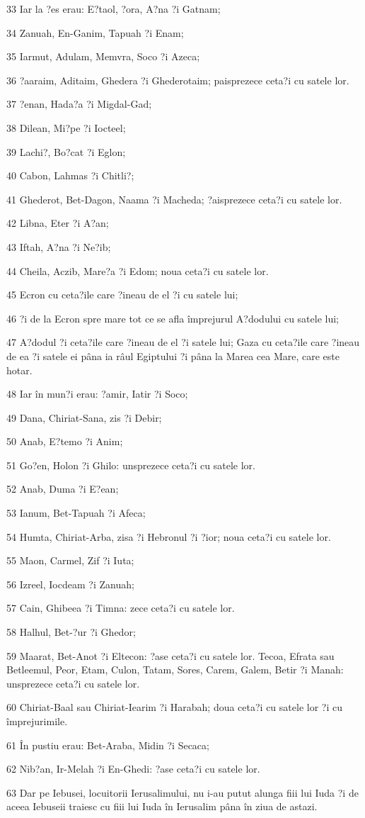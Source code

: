 \par 33 Iar la ?es erau: E?taol, ?ora, A?na ?i Gatnam;
\par 34 Zanuah, En-Ganim, Tapuah ?i Enam;
\par 35 Iarmut, Adulam, Memvra, Soco ?i Azeca;
\par 36 ?aaraim, Aditaim, Ghedera ?i Ghederotaim; paisprezece ceta?i cu satele lor.
\par 37 ?enan, Hada?a ?i Migdal-Gad;
\par 38 Dilean, Mi?pe ?i Iocteel;
\par 39 Lachi?, Bo?cat ?i Eglon;
\par 40 Cabon, Lahmas ?i Chitli?;
\par 41 Ghederot, Bet-Dagon, Naama ?i Macheda; ?aisprezece ceta?i cu satele lor.
\par 42 Libna, Eter ?i A?an;
\par 43 Iftah, A?na ?i Ne?ib;
\par 44 Cheila, Aczib, Mare?a ?i Edom; noua ceta?i cu satele lor.
\par 45 Ecron cu ceta?ile care ?ineau de el ?i cu satele lui;
\par 46 ?i de la Ecron spre mare tot ce se afla împrejurul A?dodului cu satele lui;
\par 47 A?dodul ?i ceta?ile care ?ineau de el ?i satele lui; Gaza cu ceta?ile care ?ineau de ea ?i satele ei pâna ia râul Egiptului ?i pâna la Marea cea Mare, care este hotar.
\par 48 Iar în mun?i erau: ?amir, Iatir ?i Soco;
\par 49 Dana, Chiriat-Sana, zis ?i Debir;
\par 50 Anab, E?temo ?i Anim;
\par 51 Go?en, Holon ?i Ghilo: unsprezece ceta?i cu satele lor.
\par 52 Anab, Duma ?i E?ean;
\par 53 Ianum, Bet-Tapuah ?i Afeca;
\par 54 Humta, Chiriat-Arba, zisa ?i Hebronul ?i ?ior; noua ceta?i cu satele lor.
\par 55 Maon, Carmel, Zif ?i Iuta;
\par 56 Izreel, Iocdeam ?i Zanuah;
\par 57 Cain, Ghibeea ?i Timna: zece ceta?i cu satele lor.
\par 58 Halhul, Bet-?ur ?i Ghedor;
\par 59 Maarat, Bet-Anot ?i Eltecon: ?ase ceta?i cu satele lor. Tecoa, Efrata sau Betleemul, Peor, Etam, Culon, Tatam, Sores, Carem, Galem, Betir ?i Manah: unsprezece ceta?i cu satele lor.
\par 60 Chiriat-Baal sau Chiriat-Iearim ?i Harabah; doua ceta?i cu satele lor ?i cu împrejurimile.
\par 61 În pustiu erau: Bet-Araba, Midin ?i Secaca;
\par 62 Nib?an, Ir-Melah ?i En-Ghedi: ?ase ceta?i cu satele lor.
\par 63 Dar pe Iebusei, locuitorii Ierusalimului, nu i-au putut alunga fiii lui Iuda ?i de aceea Iebuseii traiesc cu fiii lui Iuda în Ierusalim pâna în ziua de astazi.

